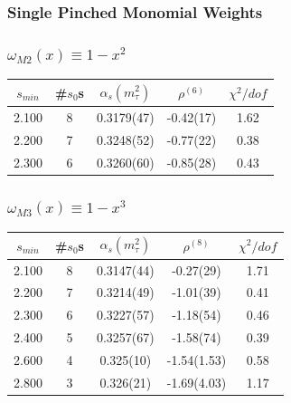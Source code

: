 \documentclass[fleqn]{beamer}
\begin{document}
\subsubsection{Single Pinched Monomial Weights}
\begin{frame}
  \frametitle{\(\omega_{M2}(x) \equiv 1-x^2\)}
  \centering
  \begin{tabular}{ccccc}
    \toprule
    \(s_{min}\) & \#\(s_0\)s & \(\alpha_s(m_\tau^2)\) & \(\rho^{(6)}\) &  \(\chi^2/dof\)  \\
    \midrule
    2.100 & 8 & 0.3179(47) & -0.42(17) & 1.62 \\
    \rowcolor{primary}
    2.200 & 7 & 0.3248(52) & -0.77(22) & 0.38 \\
    2.300 & 6 & 0.3260(60) & -0.85(28) & 0.43 \\
    \bottomrule
  \end{tabular}
\end{frame}
\begin{frame}
  \frametitle{\(\omega_{M3}(x) \equiv 1-x^3\)}
  \centering
  \begin{tabular}{ccccc}
    \toprule
    \(s_{min}\) & \#\(s_0\)s & \(\alpha_s(m_\tau^2)\) & \(\rho^{(8)}\) &  \(\chi^2/dof\)  \\
    \midrule
    2.100 & 8 & 0.3147(44) & -0.27(29) & 1.71 \\
    \rowcolor{primary}
    2.200 & 7  & 0.3214(49) & -1.01(39) & 0.41 \\
    2.300 & 6  & 0.3227(57) & -1.18(54) & 0.46 \\
    2.400 & 5  & 0.3257(67) & -1.58(74) & 0.39 \\
    2.600 & 4  & 0.325(10) & -1.54(1.53) & 0.58 \\
    2.800 & 3  & 0.326(21) & -1.69(4.03) & 1.17 \\
    \bottomrule
  \end{tabular}
\end{frame}
\end{document}
